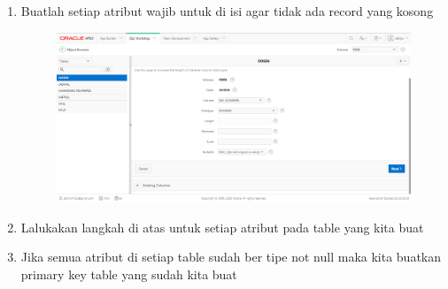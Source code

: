 \documentclass[12pt, times new roman, a4paper]{article}
\begin{document}
\begin{enumerate}
\begin{figure} [h]
\end{figure}
\\
\\
\\
\\
\\
\item Buatlah setiap atribut wajib untuk di isi agar tidak ada record yang kosong
\begin{figure} [h]
	\centering
		\includegraphics[scale=0.3]{gambar/8}
\end{figure}

\item Lalukakan langkah di atas untuk setiap atribut pada table yang kita buat

\item Jika semua atribut di setiap table sudah ber tipe not null maka kita buatkan primary key table yang sudah kita buat 


\end{enumerate}
\end{document}

